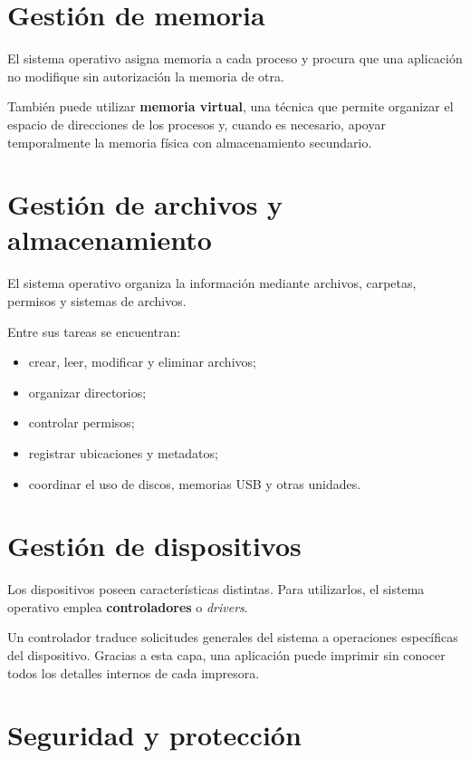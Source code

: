 \documentclass[
  spanish,
  letterpaper,
]{scrbook}
\providecommand{\tightlist}{%
  \setlength{\itemsep}{0pt}\setlength{\parskip}{0pt}}
\begin{document}
\section{Gestión de memoria}\label{gestiuxf3n-de-memoria}

El sistema operativo asigna memoria a cada proceso y procura que una
aplicación no modifique sin autorización la memoria de otra.

También puede utilizar \textbf{memoria virtual}, una técnica que permite
organizar el espacio de direcciones de los procesos y, cuando es
necesario, apoyar temporalmente la memoria física con almacenamiento
secundario.

\section{Gestión de archivos y
almacenamiento}\label{gestiuxf3n-de-archivos-y-almacenamiento}

El sistema operativo organiza la información mediante archivos,
carpetas, permisos y sistemas de archivos.

Entre sus tareas se encuentran:

\begin{itemize}
\tightlist
\item
  crear, leer, modificar y eliminar archivos;
\item
  organizar directorios;
\item
  controlar permisos;
\item
  registrar ubicaciones y metadatos;
\item
  coordinar el uso de discos, memorias USB y otras unidades.
\end{itemize}

\section{Gestión de dispositivos}\label{gestiuxf3n-de-dispositivos}

Los dispositivos poseen características distintas. Para utilizarlos, el
sistema operativo emplea \textbf{controladores} o \emph{drivers}.

Un controlador traduce solicitudes generales del sistema a operaciones
específicas del dispositivo. Gracias a esta capa, una aplicación puede
imprimir sin conocer todos los detalles internos de cada impresora.

\section{Seguridad y protección}\label{seguridad-y-protecciuxf3n}
\end{document}
